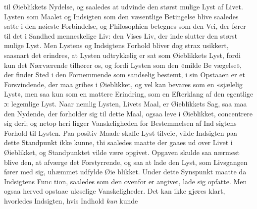 \documentclass[12pt,a4paper]{book}
\begin{document}
til Øieblikkets Nydelse, og saaledes at udvinde den størst
mulige Lyst af Livet. Lysten som Maalet og Indsigten som
den væsentlige Betingelse blive saaledes satte i den nøieste
Forbindelse, og Philosophien betegnes som den Vei, der fører
til det i Sandhed menneskelige Liv: den Vises Liv, der inde\-%
slutter den størst mulige Lyst. Men Lystens og Indsigtens
Forhold bliver dog strax usikkert, saasnart det erindres, at
Lysten udtrykkelig er sat som Øieblikkets Lyst, fordi kun det
Nærværende tilhører os, og fordi Lysten som den «milde Be\-%
vægelse», der finder Sted i den Fornemmende som sandselig
bestemt, i sin Opstaaen er et Forsvindende, der maa gribes
i Øieblikket, og vel kan bevares som en «sjælelig Lyst», men
saa kun som en mattere Erindring, som en Efterklang af den
egentlige ɔ: legemlige Lyst. Naar nemlig Lysten, Livets Maal,
er Øieblikkets Sag, saa maa den Nydende, der forholder sig
til dette Maal, ogsaa leve i Øieblikket, concentrere sig deri;
og netop heri ligger Vanskeligheden for Bestemmelsen af Ind\-%
sigtens Forhold til Lysten. Paa positiv Maade skaffe Lyst
tilveie, vilde Indsigten paa dette Standpunkt ikke kunne, thi
saaledes maatte der gaaes ud over Livet i Øieblikket, og
Standpunktet vilde være opgivet. Opgaven skulde saa nærmest
blive den, at afværge det Forstyrrende, og saa at lade den
Lyst, som Livsgangen fører med sig, uhæmmet udfylde Øie\-%
blikket. Under dette Synspunkt maatte da Indsigtens Func\-%
tion, saaledes som den ovenfor er angivet, lade sig opfatte.
Men ogsaa herved opstaae uløselige Vanskeligheder. Det kan
ikke gjøres klart, hvorledes Indsigten, hvis Indhold \emph{kun} kunde
\end{document}
